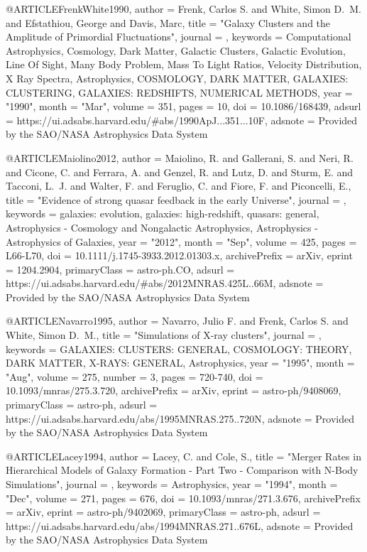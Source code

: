{@ARTICLE{FrenkWhite1990,
       author = {{Frenk}, Carlos S. and {White}, Simon D.~M. and {Efstathiou}, George and
         {Davis}, Marc},
        title = "{Galaxy Clusters and the Amplitude of Primordial Fluctuations}",
      journal = {\apj},
     keywords = {Computational Astrophysics, Cosmology, Dark Matter, Galactic Clusters, Galactic Evolution, Line Of Sight, Many Body Problem, Mass To Light Ratios, Velocity Distribution, X Ray Spectra, Astrophysics, COSMOLOGY, DARK MATTER, GALAXIES: CLUSTERING, GALAXIES: REDSHIFTS, NUMERICAL METHODS},
         year = "1990",
        month = "Mar",
       volume = {351},
        pages = {10},
          doi = {10.1086/168439},
       adsurl = {https://ui.adsabs.harvard.edu/\#abs/1990ApJ...351...10F},
      adsnote = {Provided by the SAO/NASA Astrophysics Data System}
}

@ARTICLE{Maiolino2012,
       author = {{Maiolino}, R. and {Gallerani}, S. and {Neri}, R. and {Cicone}, C. and
         {Ferrara}, A. and {Genzel}, R. and {Lutz}, D. and {Sturm}, E. and
         {Tacconi}, L.~J. and {Walter}, F. and {Feruglio}, C. and {Fiore}, F. and
         {Piconcelli}, E.},
        title = "{Evidence of strong quasar feedback in the early Universe}",
      journal = {\mnras},
     keywords = {galaxies: evolution, galaxies: high-redshift, quasars: general, Astrophysics - Cosmology and Nongalactic Astrophysics, Astrophysics - Astrophysics of Galaxies},
         year = "2012",
        month = "Sep",
       volume = {425},
        pages = {L66-L70},
          doi = {10.1111/j.1745-3933.2012.01303.x},
archivePrefix = {arXiv},
       eprint = {1204.2904},
 primaryClass = {astro-ph.CO},
       adsurl = {https://ui.adsabs.harvard.edu/\#abs/2012MNRAS.425L..66M},
      adsnote = {Provided by the SAO/NASA Astrophysics Data System}
}

@ARTICLE{Navarro1995,
       author = {{Navarro}, Julio F. and {Frenk}, Carlos S. and {White}, Simon D.~M.},
        title = "{Simulations of X-ray clusters}",
      journal = {\mnras},
     keywords = {GALAXIES: CLUSTERS: GENERAL, COSMOLOGY: THEORY, DARK MATTER, X-RAYS: GENERAL, Astrophysics},
         year = "1995",
        month = "Aug",
       volume = {275},
       number = {3},
        pages = {720-740},
          doi = {10.1093/mnras/275.3.720},
archivePrefix = {arXiv},
       eprint = {astro-ph/9408069},
 primaryClass = {astro-ph},
       adsurl = {https://ui.adsabs.harvard.edu/abs/1995MNRAS.275..720N},
      adsnote = {Provided by the SAO/NASA Astrophysics Data System}
}

@ARTICLE{Lacey1994,
       author = {{Lacey}, C. and {Cole}, S.},
        title = "{Merger Rates in Hierarchical Models of Galaxy Formation - Part Two - Comparison with N-Body Simulations}",
      journal = {\mnras},
     keywords = {Astrophysics},
         year = "1994",
        month = "Dec",
       volume = {271},
        pages = {676},
          doi = {10.1093/mnras/271.3.676},
archivePrefix = {arXiv},
       eprint = {astro-ph/9402069},
 primaryClass = {astro-ph},
       adsurl = {https://ui.adsabs.harvard.edu/abs/1994MNRAS.271..676L},
      adsnote = {Provided by the SAO/NASA Astrophysics Data System}
}

}

